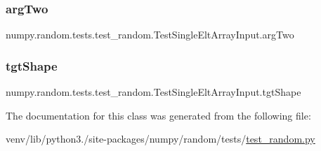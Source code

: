 \subsubsection{\texorpdfstring{arg\+Two}{argTwo}}
{\footnotesize\ttfamily numpy.\+random.\+tests.\+test\+\_\+random.\+Test\+Single\+Elt\+Array\+Input.\+arg\+Two}

\mbox{\label{classnumpy_1_1random_1_1tests_1_1test__random_1_1TestSingleEltArrayInput_a4f378ccc95868a8e0588c14fd763b708}} 
\subsubsection{\texorpdfstring{tgt\+Shape}{tgtShape}}
{\footnotesize\ttfamily numpy.\+random.\+tests.\+test\+\_\+random.\+Test\+Single\+Elt\+Array\+Input.\+tgt\+Shape}



The documentation for this class was generated from the following file\+:\begin{DoxyCompactItemize}
\item 
venv/lib/python3./site-\/packages/numpy/random/tests/\hyperlink{test__random_8py}{test\+\_\+random.\+py}\end{DoxyCompactItemize}
